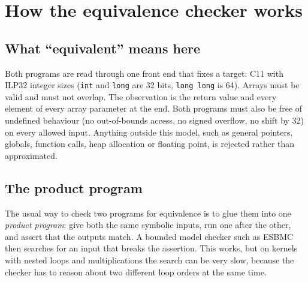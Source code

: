 \documentclass[10pt,a4paper]{article}
\begin{document}
\section{How the equivalence checker works}
\subsection{What ``equivalent'' means here}
Both programs are read through one front end that fixes a target: C11 with ILP32 integer sizes
(\texttt{int} and \texttt{long} are 32 bits, \texttt{long long} is 64). Arrays must be valid and must
not overlap. The observation is the return value and every element of every array parameter at the
end. Both programs must also be free of undefined behaviour (no out-of-bounds access, no signed
overflow, no shift by 32) on every allowed input. Anything outside this model, such as general
pointers, globals, function calls, heap allocation or floating point, is rejected rather than
approximated.

\subsection{The product program}
The usual way to check two programs for equivalence is to glue them into one \emph{product program}:
give both the same symbolic inputs, run one after the other, and assert that the outputs match. A
bounded model checker such as ESBMC then searches for an input that breaks the assertion. This works,
but on kernels with nested loops and multiplications the search can be very slow, because the
checker has to reason about two different loop orders at the same time.
\end{document}
